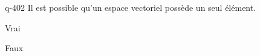 \begin{truefalse}{q-402}
Il est possible qu'un espace vectoriel possède un seul élément.
\item* Vrai
\item Faux
\end{truefalse}

